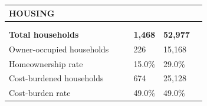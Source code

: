 \documentclass[9pt]{report}
\begin{document}
\vspace{12pt}
\setlength{\tabcolsep}{.01in} %
\begin{tabular}{p{.10in}p{.10in}p{.10in}p{3.7in}>{\hfill}p{.85in}>{\hfill}p{.85in}>{\hfill}p{.85in}>{\hfill}p{.85in}p{0.1in}}
\multicolumn{9}{l}{\parbox{7.1in}{\raggedright{\large{\strut\textbf{HOUSING}\strut}}}} \\ 
\hline
\multicolumn{4}{l}{\parbox{3.5in}{\raggedright{\textbf{}}}} & \multicolumn{1}{r}{\parbox{.85in}{\strut\raggedleft{\textbf{}\strut}}} & \multicolumn{1}{r}{\parbox{.85in}{\strut\raggedleft{\textbf{}\strut}}} & \multicolumn{1}{r}{\parbox{.85in}{\strut{}}} & \multicolumn{1}{r}{\parbox{.85in}{\strut{}}} & \\ 
\multicolumn{9}{l}{} \\ 
\multicolumn{4}{l}{\parbox{3.5in}{\strut\raggedright{\textbf{Total households}\strut}}} & \textbf{} & \textbf{} & \textbf{1,468} & \textbf{52,977} & \textbf{} \\ 
\multicolumn{4}{l}{\parbox{3.6in}{\strut\raggedright{{Owner-occupied households}}\strut}} &  &  & 226 & 15,168 & \multicolumn{1}{l}{}  \\ 
\multicolumn{4}{l}{\parbox{3.6in}{\strut\raggedright{{Homeownership rate}}\strut}} &  &  & 15.0\% & 29.0\% & \multicolumn{1}{l}{}  \\ 
\multicolumn{4}{l}{\parbox{3.6in}{\strut\raggedright{{Cost-burdened households}}\strut}} &  &  & 674 & 25,128 & \multicolumn{1}{l}{}  \\ 
\multicolumn{4}{l}{\parbox{3.6in}{\strut\raggedright{{Cost-burden rate}}\strut}} &  &  & 49.0\% & 49.0\% & \multicolumn{1}{l}{}  \\ 

\end{tabular}
\setlength{\tabcolsep}{6pt} %
\end{document}

